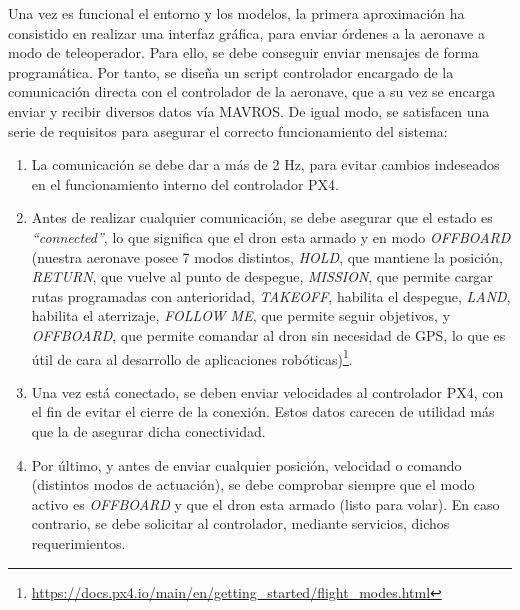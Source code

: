 Una vez es funcional el entorno y los modelos, la primera aproximación ha consistido en realizar una interfaz gráfica, para enviar órdenes a la aeronave a modo de teleoperador. Para ello, se debe conseguir enviar mensajes de forma programática. Por tanto, se diseña un script controlador encargado de la comunicación directa con el controlador de la aeronave, que a su vez se encarga enviar y recibir diversos datos vía MAVROS. De igual modo, se satisfacen una serie de requisitos para asegurar el correcto funcionamiento del sistema:

\begin{enumerate}
	\item La comunicación se debe dar a más de 2 Hz, para evitar cambios indeseados en el funcionamiento interno del controlador PX4.
	\item Antes de realizar cualquier comunicación, se debe asegurar que el estado es \emph{``connected''}, lo que significa que el dron esta armado y en modo \emph{OFFBOARD} (nuestra aeronave posee 7 modos distintos, \emph{HOLD}, que mantiene la posición, \emph{RETURN}, que vuelve al punto de despegue, \emph{MISSION}, que permite cargar rutas programadas con anterioridad, \emph{TAKEOFF}, habilita el despegue, \emph{LAND}, habilita el aterrizaje, \emph{FOLLOW ME}, que permite seguir objetivos, y \emph{OFFBOARD}, que permite comandar al dron sin necesidad de GPS, lo que es útil de cara al desarrollo de aplicaciones robóticas)\footnote[1]{\url{https://docs.px4.io/main/en/getting_started/flight_modes.html}}.
    \item Una vez está conectado, se deben enviar velocidades al controlador PX4, con el fin de evitar el cierre de la conexión. Estos datos carecen de utilidad más que la de asegurar dicha conectividad.
    \item Por último, y antes de enviar cualquier posición, velocidad o comando (distintos modos de actuación), se debe comprobar siempre que el modo activo es \emph{OFFBOARD} y que el dron esta armado (listo para volar). En caso contrario, se debe solicitar al controlador, mediante servicios, dichos requerimientos.
\end{enumerate}

